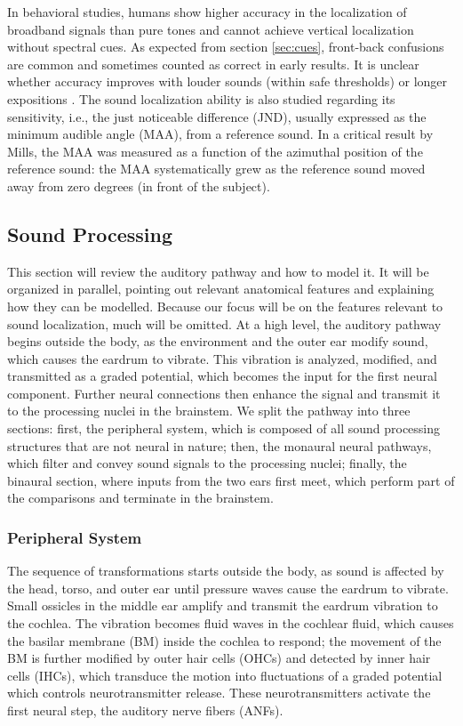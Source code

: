 \documentclass[11pt,a4paper]{article}
\begin{document}
In behavioral studies, humans show higher accuracy in the localization of broadband signals than pure tones and cannot achieve vertical localization without spectral cues. As expected from section \ref{sec:cues}, front-back confusions are common \cite{hillResolutionFrontbackConfusion2000} and sometimes counted as correct in early results. It is unclear whether accuracy improves with louder sounds (within safe thresholds) or longer expositions \cite{yostSoundSourceLocalization2016}. The sound localization ability is also studied regarding its sensitivity, i.e., the just noticeable difference (JND), usually expressed as the minimum audible angle (MAA), from a reference sound. In a critical result by Mills, the MAA was measured as a function of the azimuthal position of the reference sound: the MAA systematically grew as the reference sound moved away from zero degrees (in front of the subject).


\subsection{Sound Processing}\label{sec:model-periph}
This section will review the auditory pathway and how to model it. It will be organized in parallel, pointing out relevant anatomical features and explaining how they can be modelled. Because our focus will be on the features relevant to sound localization, much will be omitted. At a high level, the auditory pathway begins outside the body, as the environment and the outer ear modify sound, which causes the eardrum to vibrate. This vibration is analyzed, modified, and transmitted as a graded potential, which becomes the input for the first neural component. Further neural connections then enhance the signal and transmit it to the processing nuclei in the brainstem.
We split the pathway into three sections: first, the peripheral system, which is composed of all sound processing structures that are not neural in nature; then, the monaural neural pathways, which filter and convey sound signals to the processing nuclei; finally, the binaural section, where inputs from the two ears first meet, which perform part of the comparisons and terminate in the brainstem.

\subsubsection{Peripheral System}
The sequence of transformations starts outside the body, as sound is affected by the head, torso, and outer ear until pressure waves cause the eardrum to vibrate. Small ossicles in the middle ear amplify and transmit the eardrum vibration to the cochlea. The vibration becomes fluid waves in the cochlear fluid, which causes the basilar membrane (BM) inside the cochlea to respond; the movement of the BM is further modified by outer hair cells (OHCs) and detected by inner hair cells (IHCs), which transduce the motion into fluctuations of a graded potential which controls neurotransmitter release. These neurotransmitters activate the first neural step, the auditory nerve fibers (ANFs).
\end{document}
